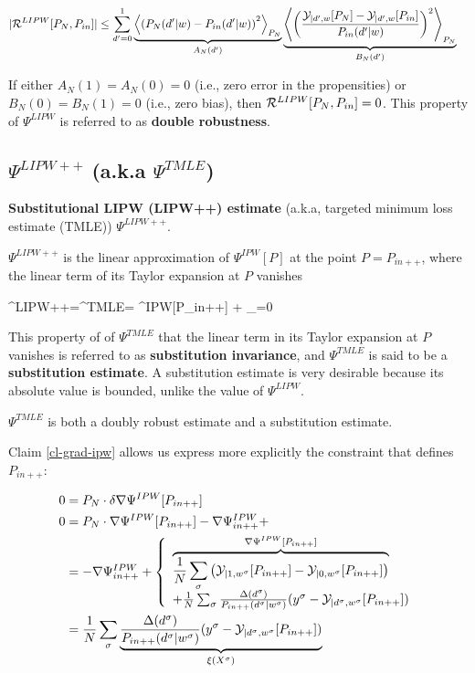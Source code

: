 \begin{align}
|{\cal R}^{LIPW}[P_N,P_{in}]|&\leq
\sum_{d'=0}^1
\underbrace{
\left\langle
\left(
P_N(d'|w)-P_{in}(d'|w)
\right)^2
\right\rangle_{P_N}
}_{A_N(d')}
\underbrace{
\left\langle
\left(
\frac{
{\cal Y}_{|d',w}[P_N]-{\cal Y}_{|d',w}[P_{in}]}
{P_{in}(d'|w)}
\right)^2
\right\rangle_{P_N}
}_{B_N(d')}
\end{align}

If either $A_N(1)=A_N(0)=0$ (i.e.,
zero error in the propensities) or $B_N(0)=B_N(1)=0$ (i.e.,
zero bias),
then ${\cal R}^{LIPW}[P_N,P_{in}]=0$.
This property
of $\Psi^{LIPW}$ is referred to as {\bf double robustness}.


\subsection{$\Psi^{LIPW++}$ (a.k.a $\Psi^{TMLE}$)}

{\bf Substitutional LIPW (LIPW++) estimate}
(a.k.a, targeted minimum loss estimate (TMLE)) $\Psi^{LIPW++}$.

$\Psi^{LIPW++}$ is the
linear approximation
 of $\Psi^{IPW}[P]$ at the point $P=P_{in++}$,
where the linear term
of its Taylor expansion at $P$ vanishes

\beq
\Psi^{LIPW++}=\Psi^{TMLE}=
\Psi^{IPW}[P_{in++}] +
_{=0}
\eeq

This property of
of $\Psi^{TMLE}$
that the linear term
in its Taylor expansion at $P$ vanishes
is referred to as {\bf substitution
invariance}, and $\Psi^{TMLE}$
is said to be a {\bf substitution estimate}.
A substitution estimate is
very desirable because
its
absolute value is bounded, unlike
the value of $\Psi^{LIPW}$.

$\Psi^{TMLE}$ is both
a doubly robust estimate and a substitution estimate.

Claim \ref{cl-grad-ipw} allows us
express
more explicitly the constraint that defines $P_{in++}$:

\begin{align}
0 &=
P_N\cdot\delta\nabla\Psi^{IPW}[P_{in++}]
\\
0 &=
P_N\cdot\nabla\Psi^{IPW}[P_{in++}]-\nabla\Psi^{IPW}_{in++}+
\\
&= -\nabla\Psi^{IPW}_{in++}+
\left\{
\begin{array}{l}
\overbrace{
\frac{1}{N}
\sum_\sigma
\left(
{\cal Y}_{|1,w^\sigma}[P_{in++}]
-
{\cal Y}_{|0,w^\sigma}[P_{in++}]
\right)
}^{ \nabla\Psi^{IPW}[P_{in++}]}
\\
+
\frac{1}{N}
\sum_\sigma
\frac{\Delta(d^\sigma)}{P_{in++}(d^\sigma|w^\sigma)}
(y^\sigma-{\cal Y}_{|d^\sigma,w^\sigma}[P_{in++}])
\end{array}
\right.
\\
&=
\frac{1}{N}
\sum_\sigma \underbrace{
\frac{\Delta(d^\sigma)}{P_{in++}(d^\sigma|w^\sigma)}
(y^\sigma-{\cal Y}_{|d^\sigma,w^\sigma}[P_{in++}])
}_{\xi(X^\sigma)}
\label{eq-loss-xi}
\end{align}


